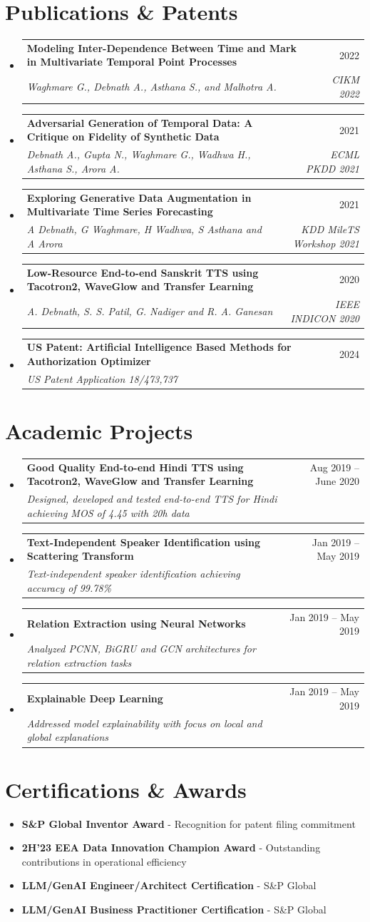\documentclass[letterpaper,11pt]{article}
\makeatletter
\newcommand{\resumeItem}[1]{\item\small{#1 \vspace{-2pt}}}
\newcommand{\resumeSubheading}[4]{
  \vspace{-2pt}\item
    \begin{tabular*}{0.97\textwidth}[t]{l@{\extracolsep{\fill}}r}
      \textbf{#1} & #2 \\
      \textit{\small#3} & \textit{\small #4} \\
    \end{tabular*}\vspace{-7pt}
}
\newcommand{\resumeSubHeadingListStart}{\begin{itemize}[leftmargin=0.15in, label={}]}
\newcommand{\resumeSubHeadingListEnd}{\end{itemize}}
\makeatother
\begin{document}
\section{Publications \& Patents}
  \resumeSubHeadingListStart
    \resumeSubheading
      {Modeling Inter-Dependence Between Time and Mark in Multivariate Temporal Point Processes}{2022}
      {Waghmare G., Debnath A., Asthana S., and Malhotra A.}{CIKM 2022}
    \resumeSubheading
      {Adversarial Generation of Temporal Data: A Critique on Fidelity of Synthetic Data}{2021}
      {Debnath A., Gupta N., Waghmare G., Wadhwa H., Asthana S., Arora A.}{ECML PKDD 2021}
    \resumeSubheading
      {Exploring Generative Data Augmentation in Multivariate Time Series Forecasting}{2021}
      {A Debnath, G Waghmare, H Wadhwa, S Asthana and A Arora}{KDD MileTS Workshop 2021}
    \resumeSubheading
      {Low-Resource End-to-end Sanskrit TTS using Tacotron2, WaveGlow and Transfer Learning}{2020}
      {A. Debnath, S. S. Patil, G. Nadiger and R. A. Ganesan}{IEEE INDICON 2020}
    \resumeSubheading
      {US Patent: Artificial Intelligence Based Methods for Authorization Optimizer}{2024}
      {US Patent Application 18/473,737}{}
  \resumeSubHeadingListEnd

\section{Academic Projects}
    \resumeSubHeadingListStart
      \resumeSubheading
          {Good Quality End-to-end Hindi TTS using Tacotron2, WaveGlow and Transfer Learning}{Aug 2019 -- June 2020}
          {Designed, developed and tested end-to-end TTS for Hindi achieving MOS of 4.45 with 20h data}{}
      \resumeSubheading
          {Text-Independent Speaker Identification using Scattering Transform}{Jan 2019 -- May 2019}
          {Text-independent speaker identification achieving accuracy of 99.78\%}{}
      \resumeSubheading
          {Relation Extraction using Neural Networks}{Jan 2019 -- May 2019}
          {Analyzed PCNN, BiGRU and GCN architectures for relation extraction tasks}{}
      \resumeSubheading
          {Explainable Deep Learning}{Jan 2019 -- May 2019}
          {Addressed model explainability with focus on local and global explanations}{}
    \resumeSubHeadingListEnd

\section{Certifications \& Awards}
  \resumeSubHeadingListStart
    \resumeItem{\textbf{S\&P Global Inventor Award} - Recognition for patent filing commitment}
    \resumeItem{\textbf{2H'23 EEA Data Innovation Champion Award} - Outstanding contributions in operational efficiency}
    \resumeItem{\textbf{LLM/GenAI Engineer/Architect Certification} - S\&P Global}
    \resumeItem{\textbf{LLM/GenAI Business Practitioner Certification} - S\&P Global}
  \resumeSubHeadingListEnd

\end{document}
